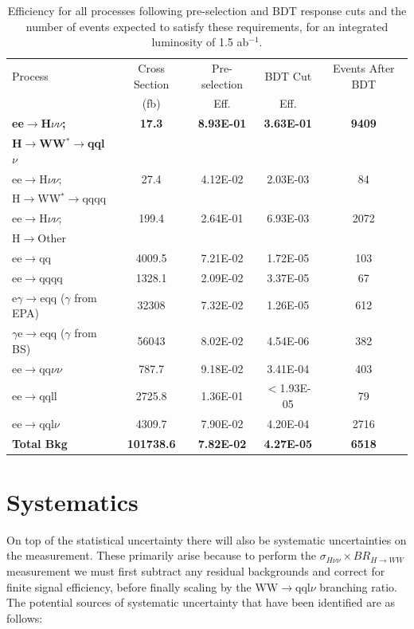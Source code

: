 \begin{table}
  \centering
  \begin{tabular}{l c c c c}
   \toprule
    Process & Cross Section & Pre-selection & BDT Cut  & Events After BDT     \\
    & (fb) & Eff. & Eff. &      \\
    \midrule
    \midrule
    \bf{ee$\rightarrow$H$\nu\nu$;}            & \bf{17.3}    &  \bf{8.93E-01}  & \bf{3.63E-01} & \bf{9409}    \\
    \bf{H$\rightarrow$WW$^*\rightarrow$qql$\nu$} & & & & \\
    \midrule
    \midrule
    ee$\rightarrow$H$\nu\nu$;  & 27.4    & 4.12E-02 & 2.03E-03 & 84  \\
    H$\rightarrow$WW$^*\rightarrow$qqqq & & & & \\
    ee$\rightarrow$H$\nu\nu$; & 199.4 & 2.64E-01 & 6.93E-03 & 2072 \\
    H$\rightarrow$Other & & & & \\
    \midrule
    \midrule
    ee$\rightarrow$qq               & 4009.5    & 7.21E-02 &  1.72E-05 & 103  \\ 
    ee$\rightarrow$qqqq               & 1328.1    &  2.09E-02 & 3.37E-05 & 67   \\ 
    e$\gamma$$\rightarrow$eqq ($\gamma$ from EPA)                 & 32308    & 7.32E-02  & 1.26E-05 & 612  \\ 
    $\gamma$e$\rightarrow$eqq ($\gamma$ from BS)               &  56043   & 8.02E-02 & 4.54E-06 & 382  \\ 
    ee$\rightarrow$qq$\nu\nu$               & 787.7    & 9.18E-02 & 3.41E-04 & 403   \\ 
    ee$\rightarrow$qqll               & 2725.8    & 1.36E-01  & $<$1.93E-05 & 79    \\ 
    ee$\rightarrow$qql$\nu$              & 4309.7    & 7.90E-02  & 4.20E-04 & 2716    \\ 
    \midrule
    \midrule
    \bf{Total Bkg}                    & \bf{101738.6} & \bf{7.82E-02} & \bf{4.27E-05} & \bf{6518} \\
    \midrule
    \bottomrule
  \end{tabular}
  \label{tab:finalHiggsResults}
  \caption[Samples Used]{Efficiency for all processes following pre-selection and BDT response cuts and the number of events expected to satisfy these requirements, for an integrated luminosity of 1.5 ab$^{-1}$.}
  \label{cuts}
\end{table}

\section{Systematics}
\label{higgsSystematics}
On top of the statistical uncertainty there will also be systematic uncertainties on the measurement. These primarily arise because to perform the $\sigma_{H\nu\nu}\times BR_{H\rightarrow WW}$ measurement we must first subtract any residual backgrounds and correct for finite signal efficiency, before finally scaling by the WW$\rightarrow$qql$\nu$ branching ratio. The potential sources of systematic uncertainty that have been identified are as follows:

